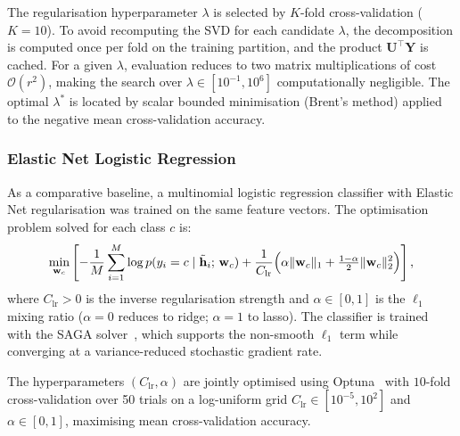 \documentclass[11pt, oneside]{article}
\begin{document}
The regularisation hyperparameter \(\lambda\) is selected by
\(K\)-fold cross-validation (\(K = 10\)).
To avoid recomputing the SVD for each candidate \(\lambda\),
the decomposition is computed once per fold on the training partition,
and the product \(\mathbf{U}^\top\mathbf{Y}\) is cached.
For a given \(\lambda\), evaluation reduces to two matrix multiplications
of cost \(\mathcal{O}(r^2)\), making the search over \(\lambda \in [10^{-1}, 10^{6}]\)
computationally negligible.
The optimal \(\lambda^*\) is located by scalar bounded minimisation
(Brent's method) applied to the negative mean cross-validation accuracy.

\subsubsection{Elastic Net Logistic Regression}
\label{sec:elasticnet}

As a comparative baseline, a multinomial logistic regression classifier with
Elastic Net regularisation was trained on the same feature vectors.
The optimisation problem solved for each class \(c\) is:
\begin{equation}
  \min_{\mathbf{w}_c}
  \left[
    -\frac{1}{M}\sum_{i=1}^{M} \log p(y_i = c \mid \tilde{\mathbf{h}}_i;\,\mathbf{w}_c)
    + \frac{1}{C_{\mathrm{lr}}}
      \Bigl(\alpha\|\mathbf{w}_c\|_1
           + \tfrac{1-\alpha}{2}\|\mathbf{w}_c\|_2^2\Bigr)
  \right],
  \label{eq:elasticnet}
\end{equation}
where \(C_{\mathrm{lr}} > 0\) is the inverse regularisation strength and
\(\alpha \in [0,1]\) is the \(\ell_1\) mixing ratio
(\(\alpha = 0\) reduces to ridge; \(\alpha = 1\) to lasso).
The classifier is trained with the SAGA solver~\cite{defazio2014saga},
which supports the non-smooth \(\ell_1\) term while converging at a
variance-reduced stochastic gradient rate.

The hyperparameters \((C_{\mathrm{lr}}, \alpha)\) are jointly optimised using
Optuna~\cite{akiba2019optuna} with \(10\)-fold cross-validation over
50 trials on a log-uniform grid
\(C_{\mathrm{lr}} \in [10^{-5}, 10^{2}]\) and \(\alpha \in [0, 1]\),
maximising mean cross-validation accuracy.
\end{document}
